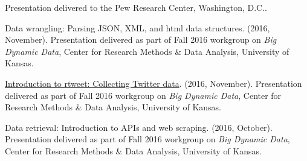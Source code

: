 \begin{bibenum}
      Presentation delivered to the Pew Research Center, Washington, D.C..
    \item[] Data wrangling: Parsing JSON, XML, and html data structures. (2016, November).
      Presentation delivered as part of Fall 2016 workgroup on \textit{Big Dynamic Data},
      Center for Research Methods \& Data Analysis, University of Kansas.
    \item[]
      \href{https://github.com/mkearney/bigdata-workgroup}{Introduction to rtweet: Collecting Twitter data}. (2016, November).
      Presentation delivered as part of Fall 2016 workgroup on \textit{Big Dynamic Data},
      Center for Research Methods \& Data Analysis, University of Kansas.
    \item[] Data retrieval: Introduction to APIs and web scraping. (2016, October).
      Presentation delivered as part of Fall 2016 workgroup on \textit{Big Dynamic Data},
      Center for Research Methods \& Data Analysis, University of Kansas.
  \end{bibenum}
